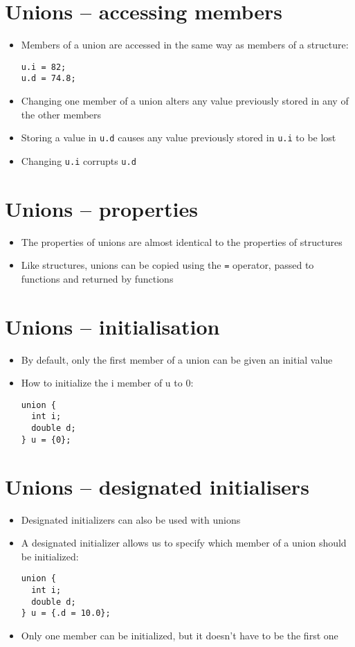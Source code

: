 \documentclass{article}
\begin{document}
\section{Unions -- accessing members}
\begin{itemize}
\item Members of a union are accessed in the same way as members of a structure:
\begin{verbatim}
u.i = 82;
u.d = 74.8;
\end{verbatim}
\item Changing one member of a union alters any value previously stored in any of the other members
\item Storing a value in \verb!u.d! causes any value previously stored in \verb!u.i! to be lost
\item Changing \verb!u.i! corrupts \verb!u.d!
\end{itemize}



\section{Unions -- properties}
\begin{itemize}
\item The properties of unions are almost identical to the properties of structures

\item Like structures, unions can be copied using the \verb!=! operator, passed to functions and returned by functions
\end{itemize}



\section{Unions -- initialisation}
\begin{itemize}
\item By default, only the first member of a union can be given an initial value
\item How to initialize the i member of u to 0:
\begin{verbatim}
union {
  int i;
  double d;
} u = {0};
\end{verbatim}
\end{itemize}



\section{Unions -- designated initialisers}
\begin{itemize}
\item Designated initializers can also be used with unions
\item A designated initializer allows us to specify which member of a union should be initialized:
\begin{verbatim}
union {
  int i;
  double d;
} u = {.d = 10.0};
\end{verbatim}
\item Only one member can be initialized, but it doesn't have to be the first one
\end{itemize}
\end{document}

